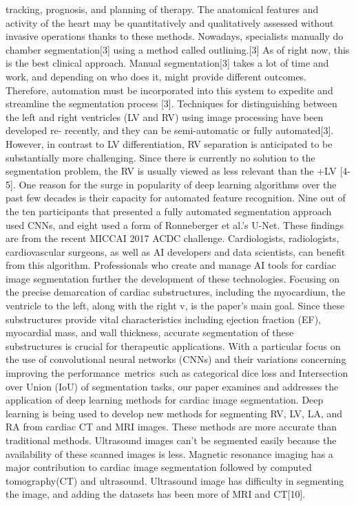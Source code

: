 \documentclass[runningheads]{llncs}
\begin{document}
tracking, prognosis, and planning of therapy. The anatomical features and activity of the heart may be quantitatively and qualitatively assessed without invasive operations thanks to these methods.
Nowadays, specialists manually do chamber segmentation[3] using a method called outlining.[3] As of right now, this is the best clinical approach. Manual segmentation[3] takes a lot of time and work, and depending on who does it, might provide different outcomes. Therefore, automation must be incorporated into this system to expedite and streamline the segmentation process [3]. Techniques for distinguishing between the left and right ventricles (LV and RV) using image processing have been developed re- recently, and they can be semi-automatic or fully automated[3]. However, in contrast to LV differentiation, RV separation is anticipated to be substantially more challenging. Since there is currently no solution to the segmentation problem, the RV is usually viewed as less relevant than the +LV [4-5]. One reason for the surge in popularity of deep learning algorithms over the past few decades is their capacity for automated feature recognition.
Nine out of the ten participants that presented a fully automated segmentation approach used CNNs, and eight used a form of Ronneberger et al.’s U-Net. These findings are from the recent MICCAI 2017 ACDC challenge. Cardiologists, radiologists, cardiovascular surgeons, as well as AI developers and data scientists, can benefit from this algorithm. Professionals who create and manage AI tools for cardiac image segmentation further the development of these technologies. Focusing on the precise demarcation of cardiac substructures, including the myocardium, the ventricle to the left, along with the right v, is the paper's main goal. Since these substructures provide vital characteristics including ejection fraction (EF), myocardial mass, and wall thickness, accurate segmentation of these substructures is crucial for therapeutic applications.
With a particular focus on the use of convolutional neural networks (CNNs) and their variations concerning improving the performance metrics such as categorical dice loss and Intersection over Union (IoU) of segmentation tasks, our paper examines and addresses the application of deep learning methods for cardiac image segmentation.
Deep learning is being used to develop new methods for segmenting RV, LV, LA, and RA from cardiac CT and MRI images. These methods are more accurate than traditional methods. Ultrasound images can’t be segmented easily because the availability of these scanned images is less. Magnetic resonance imaging has a major contribution to cardiac image segmentation followed by computed tomography(CT) and ultrasound. Ultrasound image has difficulty in segmenting the image, and adding the datasets has been more of MRI and CT[10].
\end{document}
